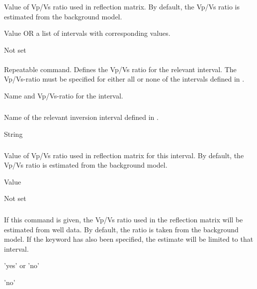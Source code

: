 \subsubsection{}
 \slist
   \item \Description Value of Vp/Vs ratio used in reflection
     matrix. By default, the Vp/Vs ratio is estimated from the
     background model.
   \item \Argument Value OR a list of intervals with corresponding values.
   \item \Default Not set
   \elist
   
\paragraph{}
 \slist
   \item \Description Repeatable command. Defines the Vp/Vs ratio for the relevant interval. The Vp/Vs-ratio must be specified for either all or none of the intervals defined in .
   \item \Argument Name and Vp/Vs-ratio for the interval.
   \item \Default
 \elist

\subparagraph{}
 \slist
   \item \Description Name of the relevant inversion interval defined in .
   \item \Argument String
   \item \Default
 \elist
 
 \subparagraph{}
 \slist
   \item \Description Value of Vp/Vs ratio used in reflection
     matrix for this interval. By default, the Vp/Vs ratio is estimated from the
     background model.
   \item \Argument Value
   \item \Default Not set
   \elist
 
\subsubsection{}
 \slist
   \item \Description If this command is given, the Vp/Vs ratio used
     in the reflection matrix will be estimated from well data. By
     default, the ratio is taken from the background model. If the
     keyword  has also been specified,
     the estimate will be limited to that interval.
   \item \Argument 'yes' or 'no'
   \item \Default 'no'
   \elist

